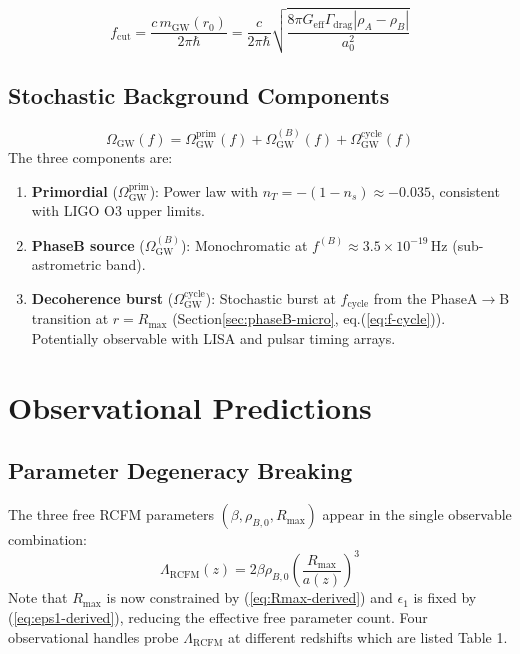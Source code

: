 \documentclass[10pt,twocolumn]{article}
\theoremstyle{definition}
\newcommand{\Rmax}{R_{\max}}
\newcommand{\rhoA}{\rho_{A}}
\newcommand{\rhoB}{\rho_{B}}
\newcommand{\Geff}{G_{\mathrm{eff}}}
\newcommand{\Gammadrag}{\Gamma_{\mathrm{drag}}}
\begin{document}
\begin{equation}
  f_{\mathrm{cut}}
    = \frac{c\,m_{\mathrm{GW}}(r_{0})}{2\pi\hbar}
    = \frac{c}{2\pi\hbar}
      \sqrt{\frac{8\pi\Geff\Gammadrag|\rhoA-\rhoB|}{a_{0}^{2}}}
  \label{eq:f-cut}
\end{equation}

\subsection{Stochastic Background Components}

\begin{equation}
  \Omega_{\mathrm{GW}}(f)
    = \Omega_{\mathrm{GW}}^{\mathrm{prim}}(f)
    + \Omega_{\mathrm{GW}}^{(B)}(f)
    + \Omega_{\mathrm{GW}}^{\mathrm{cycle}}(f)
  \label{eq:Omega-GW}
\end{equation}
The three components are:
\begin{enumerate}[label=(\roman*)]
  \item \textbf{Primordial} (\( \Omega_{\mathrm{GW}}^{\mathrm{prim}} \)):
    Power law with \( n_{T}=-(1-n_{s})\approx-0.035 \),
    consistent with LIGO O3 upper limits.
  \item \textbf{Phase\nobreakspace{}B source} (\( \Omega_{\mathrm{GW}}^{(B)} \)):
    Monochromatic at $f^{(B)}\approx3.5\times10^{-19}\,
    \mathrm{Hz}$ (sub-astrometric band).
  \item \textbf{Decoherence burst} (\( \Omega_{\mathrm{GW}}^{\mathrm{cycle}} \)):
    Stochastic burst at \( f_{\mathrm{cycle}} \) from the
    Phase\nobreakspace{}A$\to$B transition at \( r=\Rmax \)
    (Section\nobreakspace{}\ref{sec:phaseB-micro}, eq.\nobreakspace{}(\ref{eq:f-cycle})).
    Potentially observable with LISA and pulsar timing
    arrays.
\end{enumerate}

\section{Observational Predictions}
\label{sec:obs}

\subsection{Parameter Degeneracy Breaking}

The three free RCFM parameters
\( (\beta,\rho_{B,0},\Rmax) \) appear in the single
observable combination:
\begin{equation}
  \Lambda_{\mathrm{RCFM}}(z)
    = 2\beta\rho_{B,0}\left(\frac{\Rmax}{a(z)}\right)^{3}
\end{equation}
Note that \( \Rmax \) is now constrained by
(\ref{eq:Rmax-derived}) and \( \epsilon_{1} \) is fixed by
(\ref{eq:eps1-derived}), reducing the effective free
parameter count.  
Four observational handles probe
\( \Lambda_{\mathrm{RCFM}} \) at different redshifts which are listed Table 1.
\end{document}
